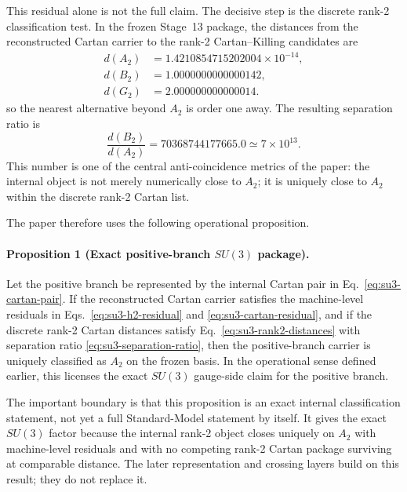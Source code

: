 \documentclass[11pt]{article}
\begin{document}
This residual alone is not the full claim. The decisive step is the discrete rank-2 classification test. In the frozen Stage~13 package, the distances from the reconstructed Cartan carrier to the rank-2 Cartan--Killing candidates are
\begin{align}
d(A_2) &= 1.4210854715202004\times 10^{-14},\\
d(B_2) &= 1.0000000000000142,\\
d(G_2) &= 2.000000000000014.
\label{eq:su3-rank2-distances}
\end{align}
so the nearest alternative beyond $A_2$ is order one away. The resulting separation ratio is
\begin{equation}
\frac{d(B_2)}{d(A_2)}
=
70368744177665.0
\simeq
7\times 10^{13}.
\label{eq:su3-separation-ratio}
\end{equation}
This number is one of the central anti-coincidence metrics of the paper: the internal object is not merely numerically close to $A_2$; it is uniquely close to $A_2$ within the discrete rank-2 Cartan list.

The paper therefore uses the following operational proposition.

\paragraph{Proposition 1 (Exact positive-branch $SU(3)$ package).}
Let the positive branch be represented by the internal Cartan pair in Eq.~\eqref{eq:su3-cartan-pair}. If the reconstructed Cartan carrier satisfies the machine-level residuals in Eqs.~\eqref{eq:su3-h2-residual} and \eqref{eq:su3-cartan-residual}, and if the discrete rank-2 Cartan distances satisfy Eq.~\eqref{eq:su3-rank2-distances} with separation ratio \eqref{eq:su3-separation-ratio}, then the positive-branch carrier is uniquely classified as $A_2$ on the frozen basis. In the operational sense defined earlier, this licenses the exact $SU(3)$ gauge-side claim for the positive branch.

The important boundary is that this proposition is an exact internal classification statement, not yet a full Standard-Model statement by itself. It gives the exact $SU(3)$ factor because the internal rank-2 object closes uniquely on $A_2$ with machine-level residuals and with no competing rank-2 Cartan package surviving at comparable distance. The later representation and crossing layers build on this result; they do not replace it.
\end{document}
